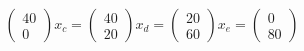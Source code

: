 \documentclass{article}
\begin{document}
\begin{itemize}
\begin{align*}
\begin{pmatrix}
            40\\
            0
        \end{pmatrix}
        x_c = \begin{pmatrix}
            40\\
            20
        \end{pmatrix}
        x_d = \begin{pmatrix}
            20\\
            60
        \end{pmatrix}
        x_e = \begin{pmatrix}
            0\\
            80
        \end{pmatrix}
    \end{align*}
\end{itemize}
\end{document}
